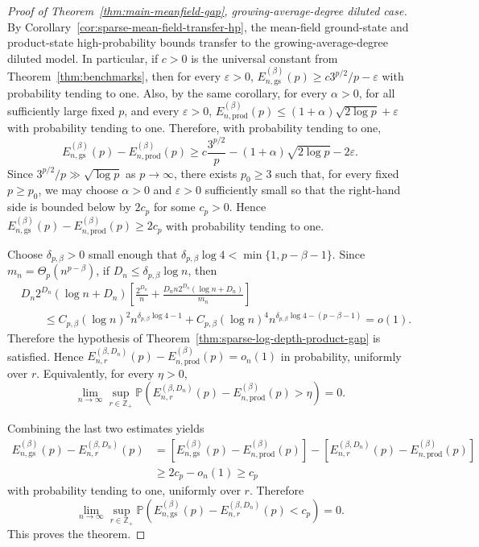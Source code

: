 \documentclass[12pt]{article}
\renewcommand{\P}{\mathbb{P}}
\begin{document}
\begin{proof}[Proof of Theorem~\ref{thm:main-meanfield-gap}, growing-average-degree diluted case]
By Corollary~\ref{cor:sparse-mean-field-transfer-hp}, the mean-field ground-state and product-state high-probability bounds transfer to the growing-average-degree diluted model. In particular, if \(c>0\) is the universal constant from Theorem~\ref{thm:benchmarks}, then for every \(\varepsilon>0\), $E_{n,\mathrm{gs}}^{(\beta)}(p) \ge c3^{p/2}/p-\varepsilon$ with probability tending to one. Also, by the same corollary, for every
\(\alpha>0\), for all sufficiently large fixed $p$, and every
\(\varepsilon>0\), $E_{n,\mathrm{prod}}^{(\beta)}(p)
\le
(1+\alpha)\sqrt{2\log p}+\varepsilon$ with probability tending to one. Therefore, with probability tending to one,
\[
E_{n,\mathrm{gs}}^{(\beta)}(p)
-
E_{n,\mathrm{prod}}^{(\beta)}(p)
\ge
c\frac{3^{p/2}}{p}
-
(1+\alpha)\sqrt{2\log p}
-
2\varepsilon .
\]
Since \(3^{p/2}/p\gg\sqrt{\log p}\) as \(p\to\infty\), there exists
\(p_0\ge3\) such that, for every fixed \(p\ge p_0\), we may choose
\(\alpha>0\) and \(\varepsilon>0\) sufficiently small so that the right-hand
side is bounded below by \(2c_p\) for some \(c_p>0\). Hence $E_{n,\mathrm{gs}}^{(\beta)}(p) - E_{n,\mathrm{prod}}^{(\beta)}(p) \ge 2c_p$ with probability tending to one.


Choose \(\delta_{p,\beta}>0\) small enough that $\delta_{p,\beta} \log 4<\min\{1,p-\beta-1\}$. Since \(m_n = \Theta_p(n^{p-\beta})\), if \(D_n\le \delta_{p,\beta}\log n\), then 
\begin{align*}
& D_n2^{D_n}(\log n+D_n)
\left[
    \frac{2^{D_n}}{n}
    +
    \frac{D_n n2^{D_n}(\log n+D_n)}{m_n}
\right] \\
&\qquad \le
C_{p,\beta}(\log n)^2 n^{\delta_{p,\beta}\log 4-1}
+
C_{p,\beta}(\log n)^4 n^{\delta_{p,\beta}\log 4-(p-\beta-1)}
=
o(1).
\end{align*}
Therefore the hypothesis of Theorem~\ref{thm:sparse-log-depth-product-gap} is satisfied. Hence $E_{n,r}^{(\beta, D_n)}(p)
-
E_{n,\mathrm{prod}}^{(\beta)}(p)
=
o_n(1)$ in probability, uniformly over $r$. Equivalently, for every \(\eta>0\),
\[
\lim_{n\to\infty}
\sup_{r\in\mathbb Z_+}
\P(
E_{n,r}^{(\beta, D_n)}(p)
-
E_{n,\mathrm{prod}}^{(\beta)}(p)
>
\eta )
=0.
\]

Combining the last two estimates yields
\begin{align*}
E_{n,\mathrm{gs}}^{(\beta)}(p)
-
E_{n,r}^{(\beta, D_n)}(p)
&=
[
E_{n,\mathrm{gs}}^{(\beta)}(p)
-
E_{n,\mathrm{prod}}^{(\beta)}(p)
]
-
[
E_{n,r}^{(\beta, D_n)}(p)
-
E_{n,\mathrm{prod}}^{(\beta)}(p)
]  \\
&\ge
2c_p-o_n(1)
\ge
c_p
\end{align*}
with probability tending to one, uniformly over $r$. Therefore
\[
\lim_{n\to\infty}
\sup_{r\in\mathbb Z_+}
\P(
    E_{n,\mathrm{gs}}^{(\beta)}(p)
    -
    E_{n,r}^{(\beta, D_n)}(p)
    < c_p
)
=0.
\]
This proves the theorem.
\end{proof}
\end{document}
